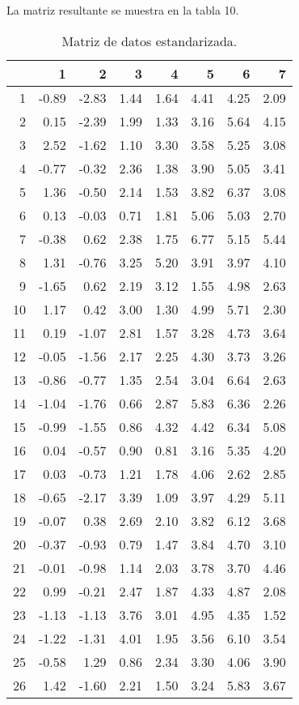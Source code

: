 \documentclass[a4paper,10pt]{article}
\begin{document}
La matriz resultante se muestra en la tabla 10.

\begin{table}[ht]
\centering
\begin{tabular}{rrrrrrrr}
  \hline
 & 1 & 2 & 3 & 4 & 5 & 6 & 7 \\ 
  \hline
1 & -0.89 & -2.83 & 1.44 & 1.64 & 4.41 & 4.25 & 2.09 \\ 
  2 & 0.15 & -2.39 & 1.99 & 1.33 & 3.16 & 5.64 & 4.15 \\ 
  3 & 2.52 & -1.62 & 1.10 & 3.30 & 3.58 & 5.25 & 3.08 \\ 
  4 & -0.77 & -0.32 & 2.36 & 1.38 & 3.90 & 5.05 & 3.41 \\ 
  5 & 1.36 & -0.50 & 2.14 & 1.53 & 3.82 & 6.37 & 3.08 \\ 
  6 & 0.13 & -0.03 & 0.71 & 1.81 & 5.06 & 5.03 & 2.70 \\ 
  7 & -0.38 & 0.62 & 2.38 & 1.75 & 6.77 & 5.15 & 5.44 \\ 
  8 & 1.31 & -0.76 & 3.25 & 5.20 & 3.91 & 3.97 & 4.10 \\ 
  9 & -1.65 & 0.62 & 2.19 & 3.12 & 1.55 & 4.98 & 2.63 \\ 
  10 & 1.17 & 0.42 & 3.00 & 1.30 & 4.99 & 5.71 & 2.30 \\ 
  11 & 0.19 & -1.07 & 2.81 & 1.57 & 3.28 & 4.73 & 3.64 \\ 
  12 & -0.05 & -1.56 & 2.17 & 2.25 & 4.30 & 3.73 & 3.26 \\ 
  13 & -0.86 & -0.77 & 1.35 & 2.54 & 3.04 & 6.64 & 2.63 \\ 
  14 & -1.04 & -1.76 & 0.66 & 2.87 & 5.83 & 6.36 & 2.26 \\ 
  15 & -0.99 & -1.55 & 0.86 & 4.32 & 4.42 & 6.34 & 5.08 \\ 
  16 & 0.04 & -0.57 & 0.90 & 0.81 & 3.16 & 5.35 & 4.20 \\ 
  17 & 0.03 & -0.73 & 1.21 & 1.78 & 4.06 & 2.62 & 2.85 \\ 
  18 & -0.65 & -2.17 & 3.39 & 1.09 & 3.97 & 4.29 & 5.11 \\ 
  19 & -0.07 & 0.38 & 2.69 & 2.10 & 3.82 & 6.12 & 3.68 \\ 
  20 & -0.37 & -0.93 & 0.79 & 1.47 & 3.84 & 4.70 & 3.10 \\ 
  21 & -0.01 & -0.98 & 1.14 & 2.03 & 3.78 & 3.70 & 4.46 \\ 
  22 & 0.99 & -0.21 & 2.47 & 1.87 & 4.33 & 4.87 & 2.08 \\ 
  23 & -1.13 & -1.13 & 3.76 & 3.01 & 4.95 & 4.35 & 1.52 \\ 
  24 & -1.22 & -1.31 & 4.01 & 1.95 & 3.56 & 6.10 & 3.54 \\ 
  25 & -0.58 & 1.29 & 0.86 & 2.34 & 3.30 & 4.06 & 3.90 \\ 
  26 & 1.42 & -1.60 & 2.21 & 1.50 & 3.24 & 5.83 & 3.67 \\ 
   \hline
\end{tabular}
\caption{Matriz de datos estandarizada.}
\end{table}
\end{document}
